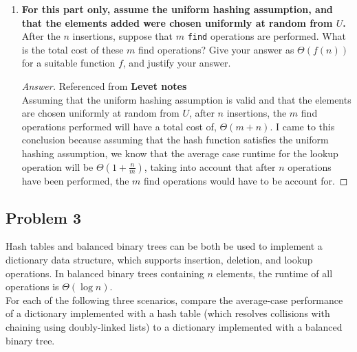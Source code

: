 \documentclass[11pt]{article}
\theoremstyle{definition}
\theoremstyle{definition}
\theoremstyle{definition}
\begin{document}
\begin{enumerate}[label=(\alph*)]
	\item \textbf{For this part only, assume the uniform hashing assumption, and that the elements added were chosen uniformly at random from $U$.} After the $n$ insertions, suppose that $m$ \texttt{find} operations are performed. What is the total cost of these $m$ find operations? Give your answer as $\Theta(f(n))$ for a suitable function $f$, and justify your answer.
    \begin{proof}[Answer] Referenced from \textbf{Levet notes}\\
    Assuming that the uniform hashing assumption is valid and that the elements are chosen uniformly at random from $U$, after $n$ insertions, the $m$ find operations performed will have a total cost of, $\Theta(m + n)$. I came to this conclusion because assuming that the hash function satisfies the uniform hashing assumption, we know that the average case runtime for the lookup operation will be $\Theta(1+\frac{n}{m})$, taking into account that after $n$ operations have been performed, the $m$ find operations would have to be account for.
    \end{proof}

\vfill
	\end{enumerate} 

\newpage
\subsection{Problem 3}
Hash tables and balanced binary trees can be both be used to implement a dictionary data structure, which supports insertion, deletion, and lookup operations. In balanced binary trees containing $n$ elements, the runtime of all operations is $\Theta(\log n)$.  \\

    \noindent For each of the following three scenarios, compare the average-case performance of a dictionary implemented with a hash table (which resolves collisions with chaining using doubly-linked lists) to a dictionary implemented with a balanced binary tree.
        
\end{document}
